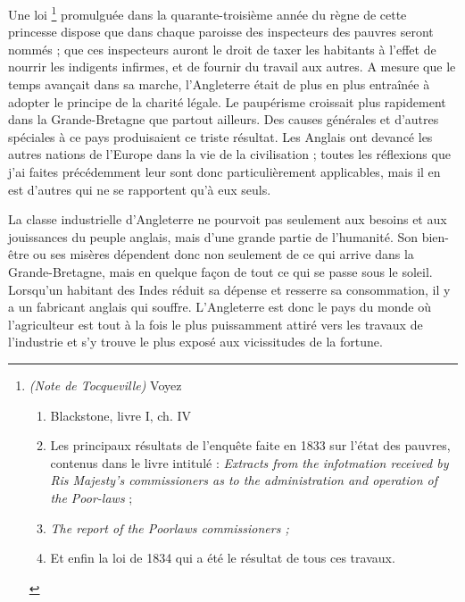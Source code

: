 \documentclass[french,twoside]{book} %
\begin{document}
Une loi \footnote{\noindent \emph{(Note de Tocqueville)} Voyez\par

\begin{enumerate}[itemsep=0pt,]
\item Blackstone, livre I, ch. IV
\item Les principaux résultats de l’enquête faite en 1833 sur l’état des pauvres, contenus dans le livre intitulé : \emph{Extracts from the infotmation received by Ris Majesty's commissioners as to the administration and operation of the Poor-laws} ;
\item \emph{The report of the Poorlaws commissioners ;}
\item Et enfin la loi de 1834 qui a été le résultat de tous ces travaux.

\end{enumerate}} promulguée dans la quarante-troisième année du règne de cette princesse dispose que dans chaque paroisse des inspecteurs des pauvres seront nommés ; que ces inspecteurs auront le droit de taxer les habitants à l’effet de nourrir les indigents infirmes, et de fournir du travail aux autres. A mesure que le temps avançait dans sa marche, l’Angleterre était de plus en plus entraînée à adopter le principe de la charité légale. Le paupérisme croissait plus rapidement dans la Grande-Bretagne que partout ailleurs. Des causes générales et d’autres spéciales à ce pays produisaient ce triste résultat. Les Anglais ont devancé les autres nations de l’Europe dans la vie de la civilisation ; toutes les réflexions que j’ai faites précédemment leur sont donc particulièrement applicables, mais il en est d’autres qui ne se rapportent qu’à eux seuls.\par
\bigbreak
\noindent La classe industrielle d’Angleterre ne pourvoit pas seulement aux besoins et aux jouissances du peuple anglais, mais d’une grande partie de l’humanité. Son bien-être ou ses misères dépendent donc non seulement de ce qui arrive dans la Grande-Bretagne, mais en quelque façon de tout ce qui se passe sous le soleil. Lorsqu’un habitant des Indes réduit sa dépense et resserre sa consommation, il y a un fabricant anglais qui souffre. L’Angleterre est donc le pays du monde où l’agriculteur est tout à la fois le plus puissamment attiré vers les travaux de l’industrie et s’y trouve le plus exposé aux vicissitudes de la fortune.\par
\end{document}
